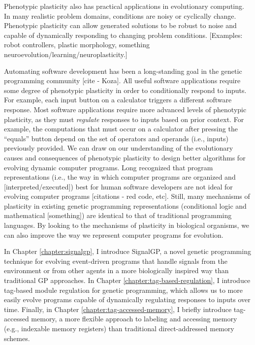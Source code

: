 Phenotypic plasticity also has practical applications in evolutionary computing.
In many realistic problem domains, conditions are noisy or cyclically change.
Phenotypic plasticity can allow generated solutions to be robust to noise and capable of dynamically responding to changing problem conditions.
[Examples: robot controllers, plastic morphology, something neuroevolution/learning/neuroplasticity.]

Automating software development has been a long-standing goal in the genetic programming community [cite - Koza].
All useful software applications require some degree of phenotypic plasticity in order to conditionally respond to inputs.
For example, each input button on a calculator triggers a different software response.
Most software applications require more advanced levels of phenotypic plasticity, as they must \textit{regulate} responses to inputs based on prior context.
For example, the computations that must occur on a calculator after pressing the ``equals'' button depend on the set of operators and operands (i.e., inputs) previously provided.
We can draw on our understanding of the evolutionary causes and consequences of phenotypic plasticity to design better algorithms for evolving dynamic computer programs.
Long recognized that program representations (i.e., the way in which computer programs are organized and [interpreted/executed]) best for human software developers are not ideal for evolving computer programs [citations - red code, etc].
Still, many mechanisms of plasticity in existing genetic programming representations (conditional logic and mathematical [something]) are identical to that of traditional programming languages.
By looking to the mechanisms of plasticity in biological organisms, we can also improve the way we represent computer programs for evolution. 

In Chapter \ref{chapter:signalgp}, I introduce SignalGP, a novel genetic programming technique for evolving event-driven programs that handle signals from the environment or from other agents in a more biologically inspired way than traditional GP approaches. 
In Chapter \ref{chapter:tag-based-regulation}, I introduce tag-based module regulation for genetic programming, which allows us to more easily evolve programs capable of dynamically regulating responses to inputs over time.
Finally, in Chapter \ref{chapter:tag-accessed-memory}, I briefly introduce tag-accessed memory, a more flexible approach to labeling and accessing memory (e.g., indexable memory registers) than traditional direct-addressed memory schemes.

